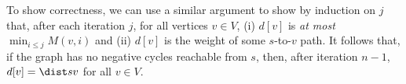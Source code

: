 To show correctness, we can use a similar argument to show by induction on $j$ that,
after each iteration $j$, for all vertices $v\in V$,
(i) $d[v]$ is \emph{at most} $\min_{i\le j} M(v, i)$ and
(ii) $d[v]$ is the weight of some $s$-to-$v$ path.
It follows that, if the graph has no negative cycles reachable from $s$,
then, after iteration $n-1$, $d[v] = \dist s v$ for all $v\in V$.


